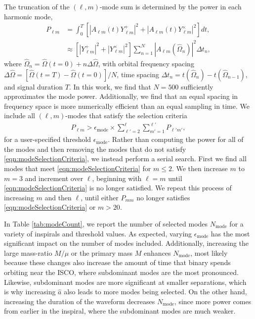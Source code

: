\documentclass[%
 reprint,
 nofootinbib,
 amsmath,amssymb,
 aps,
 prd,
]{revtex4-2}
\begin{document}
The truncation of the $(\ell, m)$-mode sum is determined by the power in each harmonic mode,
\begin{subequations} \label{eqn:powerLM}
    \begin{align}
        P_{\ell m} &= \int_0^T \left[ \left|A_{\ell m}(t) Y_{\ell m}^+\right|^2 + \left|A_{\ell m}(t) Y_{\ell m}^\times\right|^2  \right]dt ,
        \\
        &\approx \left[\left|Y_{\ell m}^+\right|^2 + \left|Y_{\ell m}^\times\right|^2 \right] \sum_{n=1}^{N} |A_{\ell m}(\hat{\Omega}_n)|^2 \Delta t_n,
    \end{align}
\end{subequations}
where $\hat{\Omega}_n = \hat{\Omega}(t=0) + n \Delta\hat{\Omega}$, with orbital frequency spacing $\Delta \hat{\Omega} = [\hat{\Omega}(t=T) - \hat{\Omega}(t=0)]/N$, time spacing $\Delta t_n = t(\hat{\Omega}_n) - t(\hat{\Omega}_{n-1})$, and signal duration $T$. In this work, we find that $N = 500$ sufficiently approximates the mode power. Additionally, we find that an equal spacing in frequency space is more numerically efficient than an equal sampling in time. We include all $(\ell, m)$-modes that satisfy the selection criteria
\begin{align} \label{eqn:modeSelectionCriteria}
    {P_{\ell m}} > \epsilon_\mathrm{mode} \times {\sum_{\ell' = 2}^{\ell} \sum_{m'=1}^{\ell'}P_{\ell' m'}},
\end{align}
for a user-specified threshold $\epsilon_\mathrm{mode}$. Rather than computing the power for all of the modes and then removing the modes that do not satisfy \eqref{eqn:modeSelectionCriteria}, we instead perform a serial search. First we find all modes that meet \eqref{eqn:modeSelectionCriteria} for $m \leq 2$. We then increase $m$ to $m = 3$ and increment over $\ell$, beginning with $\ell = m$ until \eqref{eqn:modeSelectionCriteria} is no longer satisfied. We repeat this process of increasing $m$ and then $\ell$, until either $P_{mm}$ no longer satisfies \eqref{eqn:modeSelectionCriteria} or $m > 20$.

In Table \ref{tab:modeCount}, we report the number of selected modes $N_\mathrm{mode}$ for a variety of inspirals and threshold values. As expected, varying $\epsilon_\mathrm{mode}$ has the most significant impact on the number of modes included. Additionally, increasing the large mass-ratio $M/\mu$ or the primary mass $M$ enhances $N_\mathrm{mode}$, most likely because these changes also increase the amount of time that binary spends orbiting near the ISCO, where subdominant modes are the most pronounced. Likewise, subdominant modes are more significant at smaller separations, which is why increasing $\hat{a}$ also leads to more modes being selected. On the other hand, increasing the duration of the waveform decreases $N_\mathrm{mode}$, since more power comes from earlier in the inspiral, where the subdominant modes are much weaker.
\end{document}
